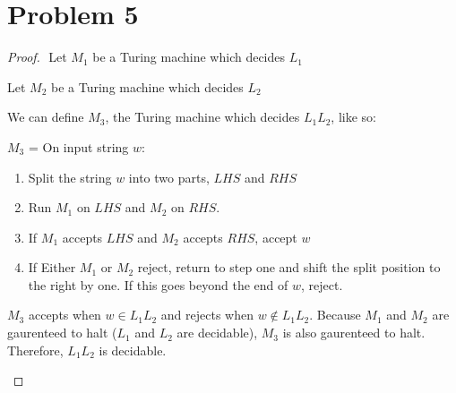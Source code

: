\documentclass{article}
\newenvironment{problem}[1]{
  \nobreak\section*{Problem #1}
}{}
\begin{document}
  \pagebreak

  \begin{problem}{5}
    \begin{proof}
      $ $\newline
      Let $M_1$ be a Turing machine which decides $L_1$

      \noindent
      Let $M_2$ be a Turing machine which decides $L_2$

      \noindent
      We can define $M_3$, the Turing machine which decides
      $L_1L_2$, like so:

      \begin{center}
        $M_3$ = On input string $w$: \begin{enumerate}
          \item Split the string $w$ into two parts, $LHS$ and $RHS$
          \item Run $M_1$ on $LHS$ and $M_2$ on $RHS$.
          \item If $M_1$ accepts $LHS$ and $M_2$ accepts $RHS$, accept $w$
          \item If Either $M_1$ or $M_2$ reject, return to step one and shift the split position to the right by one.  If this goes beyond the end of $w$, reject.
        \end{enumerate}
      \end{center}

      \noindent
      $M_3$ accepts when $w \in L_1L_2$ and rejects when
      $w \notin L_1L_2$.  Because $M_1$ and $M_2$ are
      gaurenteed to halt ($L_1$ and $L_2$ are decidable), $M_3$ is
      also gaurenteed to halt.  Therefore, $L_1L_2$ is
      decidable.

      $ $\newline
    \end{proof}
  \end{problem}
\end{document}
